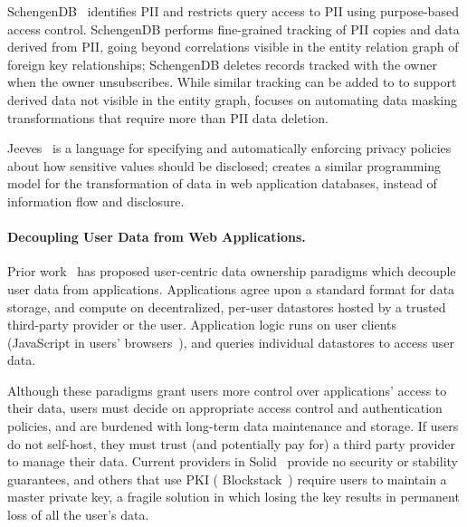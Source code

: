 SchengenDB~\cite{schengendb} identifies PII and restricts query access to PII using purpose-based
access control. SchengenDB performs fine-grained tracking of PII copies and data derived
from PII, going beyond correlations visible in the entity relation graph of foreign key
relationships; SchengenDB deletes records tracked with the owner when the owner unsubscribes.
While similar tracking can be added to \sys to support derived data not visible in the entity graph,
\sys focuses on automating data masking transformations that require more than PII data deletion. 


Jeeves~\cite{jeeves} is a language for specifying and automatically enforcing privacy policies about
how sensitive values should be disclosed; \sys creates a similar programming model for
the transformation of data in web application databases, instead of information flow and disclosure.




\paragraph{Decoupling User Data from Web Applications.} 
Prior work~\cite{diy, solid, amber, oort, w5, blockstack, bstore, databox} has proposed user-centric data
ownership paradigms which decouple user data from applications. Applications agree upon a standard
format for data storage, and compute on decentralized, per-user datastores hosted by a trusted
third-party provider or the user. Application logic runs on user clients (\eg JavaScript in users'
browsers~\cite{solid, blockstack, bstore}), and queries individual datastores to access user data.

Although these paradigms grant users more control over applications' access to their data, users
must decide on appropriate access control and authentication policies, and are burdened with
long-term data maintenance and storage. If users do not self-host, they must trust (and potentially
pay for) a third party provider to manage their data. Current providers in Solid~\cite{solid}
provide no security or stability guarantees, and others that use PKI (\eg
Blockstack~\cite{blockstack}) require users to maintain a master private key, a fragile solution in
which losing the key results in permanent loss of all the user's data.

